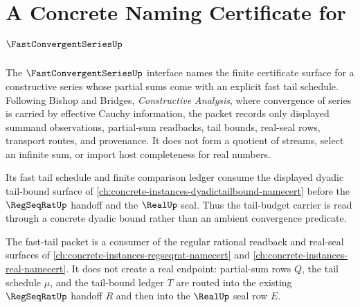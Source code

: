 \chapter{A Concrete Naming Certificate for $\FastConvergentSeriesUp$}
\label{ch:concrete-instances-fastconvergentseries-namecert}

The $\FastConvergentSeriesUp$ interface names the finite certificate surface for a constructive series whose partial sums come with an explicit fast tail schedule. Following Bishop and Bridges, \emph{Constructive Analysis}, where convergence of series is carried by effective Cauchy information, the packet records only displayed summand observations, partial-sum readbacks, tail bounds, real-seal rows, transport routes, and provenance. It does not form a quotient of streams, select an infinite sum, or import host completeness for real numbers.

Its fast tail schedule and finite comparison ledger consume the displayed dyadic tail-bound surface of \autoref{ch:concrete-instances-dyadictailbound-namecert} before the $\RegSeqRatUp$ handoff and the $\RealUp$ seal. Thus the tail-budget carrier is read through a concrete dyadic bound rather than an ambient convergence predicate.

The fast-tail packet is a consumer of the regular rational readback and real-seal surfaces of \autoref{ch:concrete-instances-regseqrat-namecert} and \autoref{ch:concrete-instances-real-namecert}. It does not create a real endpoint: partial-sum rows $Q$, the tail schedule $\mu$, and the tail-bound ledger $T$ are routed into the existing $\RegSeqRatUp$ handoff $R$ and then into the $\RealUp$ seal row $E$.

